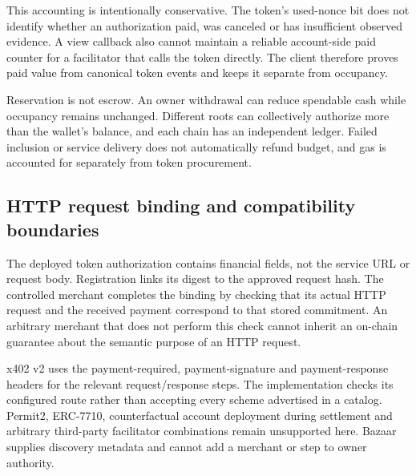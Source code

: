 This accounting is intentionally conservative. The token's used-nonce bit does not identify whether an authorization paid, was canceled or has insufficient observed evidence. A view callback also cannot maintain a reliable account-side paid counter for a facilitator that calls the token directly. The client therefore proves paid value from canonical token events and keeps it separate from occupancy.

Reservation is not escrow. An owner withdrawal can reduce spendable cash while occupancy remains unchanged. Different roots can collectively authorize more than the wallet's balance, and each chain has an independent ledger. Failed inclusion or service delivery does not automatically refund budget, and gas is accounted for separately from token procurement.

\subsection{HTTP request binding and compatibility boundaries}
The deployed token authorization contains financial fields, not the service URL or request body. Registration links its digest to the approved request hash. The controlled merchant completes the binding by checking that its actual HTTP request and the received payment correspond to that stored commitment. An arbitrary merchant that does not perform this check cannot inherit an on-chain guarantee about the semantic purpose of an HTTP request.

x402 v2 uses the payment-required, payment-signature and payment-response headers for the relevant request/response steps.\citep{x402} The implementation checks its configured route rather than accepting every scheme advertised in a catalog. Permit2, ERC-7710, counterfactual account deployment during settlement and arbitrary third-party facilitator combinations remain unsupported here. Bazaar supplies discovery metadata and cannot add a merchant or step to owner authority.\citep{bazaar}
